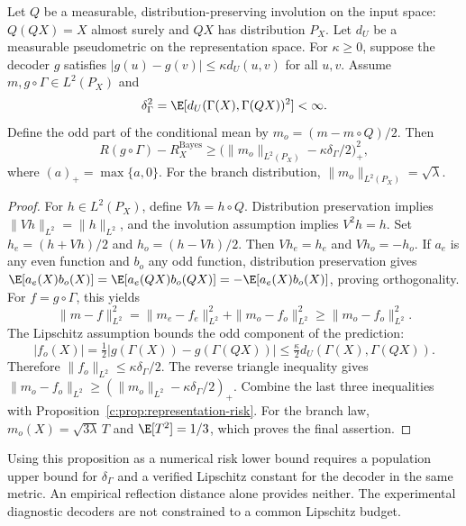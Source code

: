 \begin{proposition}
\label{c:prop:approx-symmetry}
Let $Q$ be a measurable, distribution-preserving involution on the input
space: $Q(QX)=X$ almost surely and $QX$ has distribution $P_X$.
Let $d_U$ be a measurable pseudometric on the representation space. For
$\kappa\geq0$, suppose the decoder $g$ satisfies
$|g(u)-g(v)|\leq\kappa d_U(u,v)$ for all $u,v$. Assume
$m,g\circ\Gamma\in L^2(P_X)$ and
\[
 \delta_\Gamma^2=
 \E[d_U(\Gamma(X),\Gamma(QX))^2]<\infty.
\]
Define the odd part of the conditional mean by
$m_o=(m-m\circ Q)/2$. Then
\[
 R(g\circ\Gamma)-R_X^{\mathrm{Bayes}}
 \geq\bigl(\|m_o\|_{L^2(P_X)}-\kappa\delta_\Gamma/2\bigr)_+^2,
\]
where $(a)_+=\max\{a,0\}$. For the branch distribution,
$\|m_o\|_{L^2(P_X)}=\sqrt\lambda$.
\end{proposition}
\begin{proof}
For $h\in L^2(P_X)$, define $Vh=h\circ Q$. Distribution preservation
implies $\|Vh\|_{L^2}=\|h\|_{L^2}$, and the involution assumption
implies $V^2h=h$. Set $h_e=(h+Vh)/2$ and $h_o=(h-Vh)/2$.
Then $Vh_e=h_e$ and $Vh_o=-h_o$. If $a_e$ is any even function and
$b_o$ any odd function, distribution preservation gives
$\E[a_e(X)b_o(X)]=\E[a_e(QX)b_o(QX)]
=-\E[a_e(X)b_o(X)]$, proving orthogonality.
For $f=g\circ\Gamma$, this yields
\[
 \|m-f\|_{L^2}^2
 =\|m_e-f_e\|_{L^2}^2+\|m_o-f_o\|_{L^2}^2
 \geq\|m_o-f_o\|_{L^2}^2.
\]
The Lipschitz assumption bounds the odd component of the prediction:
\[
 |f_o(X)|=\tfrac12|g(\Gamma(X))-g(\Gamma(QX))|
 \leq\tfrac\kappa2d_U(\Gamma(X),\Gamma(QX)).
\]
Therefore $\|f_o\|_{L^2}\leq\kappa\delta_\Gamma/2$. The reverse
triangle inequality gives
$\|m_o-f_o\|_{L^2}\geq
(\|m_o\|_{L^2}-\kappa\delta_\Gamma/2)_+$.
Combine the last three inequalities with
Proposition~\ref{c:prop:representation-risk}. For the branch law,
$m_o(X)=\sqrt{3\lambda}\,T$ and $\E[T^2]=1/3$, which proves the
final assertion.
\end{proof}

Using this proposition as a numerical risk lower bound requires a
population upper bound for $\delta_\Gamma$ and a verified Lipschitz
constant for the decoder in the same metric. An empirical reflection
distance alone provides neither. The experimental diagnostic decoders
are not constrained to a common Lipschitz budget.

